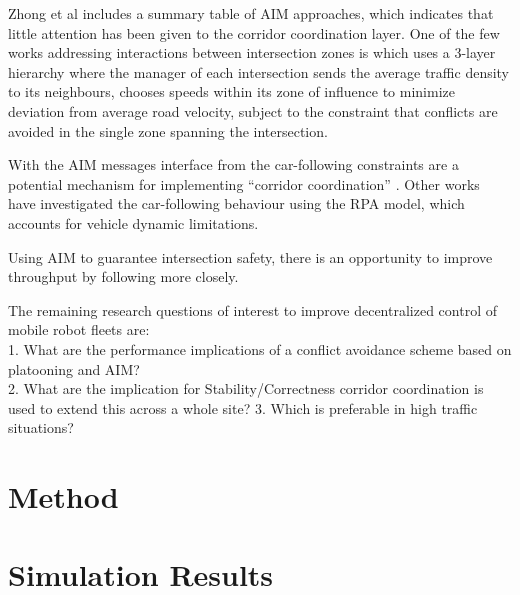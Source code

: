 \documentclass[runningheads]{llncs}
\begin{document}
Zhong et al \cite{Zhong2020} includes a summary table of AIM approaches, which indicates that little attention has been given to the corridor coordination layer.  One of the few works addressing interactions between intersection zones is \cite{Du2018} which uses a 3-layer hierarchy where the manager of each intersection sends the average traffic density to its neighbours, chooses speeds within its zone of influence to minimize deviation from average road velocity, subject to the constraint that conflicts are avoided in the single zone spanning the intersection. 

With the AIM messages interface from \cite{Levin2017} the car-following constraints are a potential mechanism for implementing ``corridor coordination'' . Other works have investigated the car-following behaviour \cite{Bichiou2019} using the RPA model, which accounts for vehicle dynamic limitations. 



Using AIM to guarantee intersection safety, there is an opportunity to improve throughput by following more closely. 
 
The remaining research questions of interest to improve decentralized control of mobile robot fleets are:\\
1.  What are the performance implications of a conflict avoidance scheme based on platooning and AIM? \\
2. What are the implication for Stability/Correctness corridor coordination is used to extend this across a whole site?
3.  Which is preferable in high traffic situations?\\










\section{Method}
\section{Simulation Results}
\end{document}
